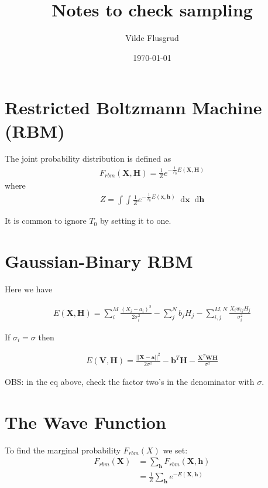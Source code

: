 \documentclass[norsk,a4paper,11pt]{article}
\title{Notes to check sampling}
\author{Vilde Flusgrud}
\newcommand*\diff{\mathop{}\!\mathrm{d}}
\newcommand{\VX}{\mathbf{X}}
\newcommand{\Vx}{\mathbf{x}}
\begin{document}
\date{\today}
\maketitle

\section{Restricted Boltzmann Machine (RBM)}

The joint probability distribution is defined as \cite{gausbinRBM}
\begin{align}
	F_{rbm}(\VX,\mathbf{H}) = \frac{1}{Z} e^{-\frac{1}{T_0}E(\VX,\mathbf{H})}
\end{align}
where
\begin{align}
	Z = \int \int \frac{1}{Z} e^{-\frac{1}{T_0}E(\Vx,\mathbf{h})} \diff \Vx \diff \mathbf{h}
\end{align}

It is common to ignore $T_0$ by setting it to one.

\section{Gaussian-Binary RBM}
Here we have \cite{gausbinRBM}

\begin{align}
	E(\VX, \mathbf{H}) = \sum_i^M \frac{(X_i - a_i)^2}{2\sigma_i^2} - \sum_j^N b_j H_j - \sum_{i,j}^{M,N} \frac{X_i w_{ij} H_j}{\sigma_i^2} 
\end{align}

If $\sigma_i = \sigma$ then

\begin{align}
	E(\mathbf{V}, \mathbf{H})= \frac{||\VX - \mathbf{a}||^2}{2\sigma^2} - \mathbf{b}^T \mathbf{H} - \frac{\VX^T \mathbf{W} \mathbf{H}}{\sigma^2}
\end{align}

OBS: in the eq above, check the factor two's in the denominator with $\sigma$.





\section{The Wave Function}
To find the marginal probability $F_{rbm}(X)$ we set:
\begin{align}
	F_{rbm}(\mathbf{X}) &= \sum_\mathbf{h} F_{rbm}(\mathbf{X}, \mathbf{h}) \\
				&= \frac{1}{Z}\sum_\mathbf{h} e^{-E(\mathbf{X}, \mathbf{h})}
\end{align}
\end{document}
